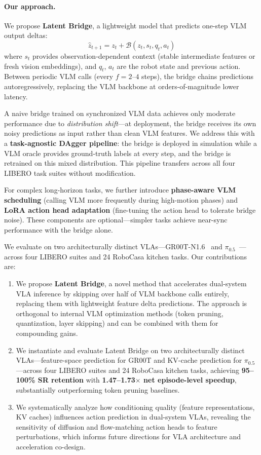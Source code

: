 \documentclass{article}
\begin{document}
\paragraph{Our approach.}
We propose \textbf{Latent Bridge}, a lightweight model that predicts one-step VLM output deltas:
\begin{equation}
    \hat{z}_{t+1} = z_t + \mathcal{B}(z_t, s_t, q_t, a_t)
\end{equation}
where $s_t$ provides observation-dependent context (stable intermediate features or fresh vision embeddings), and $q_t$, $a_t$ are the robot state and previous action.
Between periodic VLM calls (every $f=2$--$4$ steps), the bridge chains predictions autoregressively, replacing the VLM backbone at orders-of-magnitude lower latency.

A naive bridge trained on synchronized VLM data achieves only moderate performance due to \emph{distribution shift}---at deployment, the bridge receives its own noisy predictions as input rather than clean VLM features.
We address this with a \textbf{task-agnostic DAgger pipeline}: the bridge is deployed in simulation while a VLM oracle provides ground-truth labels at every step, and the bridge is retrained on this mixed distribution.
This pipeline transfers across all four LIBERO task suites without modification.

For complex long-horizon tasks, we further introduce \textbf{phase-aware VLM scheduling} (calling VLM more frequently during high-motion phases) and \textbf{LoRA action head adaptation} (fine-tuning the action head to tolerate bridge noise).
These components are optional---simpler tasks achieve near-sync performance with the bridge alone.

We evaluate on two architecturally distinct VLAs---GR00T-N1.6~\cite{bjorck2025groot} and $\pi_{0.5}$~\cite{black2024pi0}---across four LIBERO suites and 24 RoboCasa kitchen tasks.
Our contributions are:
\begin{enumerate}
    \item We propose \textbf{Latent Bridge}, a novel method that accelerates dual-system VLA inference by skipping over half of VLM backbone calls entirely, replacing them with lightweight feature delta predictions. The approach is orthogonal to internal VLM optimization methods (token pruning, quantization, layer skipping) and can be combined with them for compounding gains.
    \item We instantiate and evaluate Latent Bridge on two architecturally distinct VLAs---feature-space prediction for GR00T and KV-cache prediction for $\pi_{0.5}$---across four LIBERO suites and 24 RoboCasa kitchen tasks, achieving \textbf{95--100\% SR retention} with \textbf{1.47--1.73$\times$ net episode-level speedup}, substantially outperforming token pruning baselines.
    \item We systematically analyze how conditioning quality (feature representations, KV caches) influences action prediction in dual-system VLAs, revealing the sensitivity of diffusion and flow-matching action heads to feature perturbations, which informs future directions for VLA architecture and acceleration co-design.
\end{enumerate}
\end{document}
